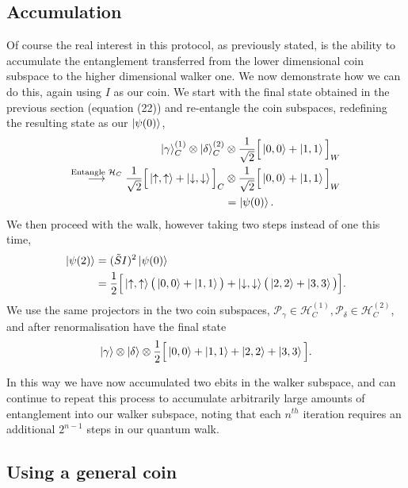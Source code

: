 \subsection{Accumulation}
Of course the real interest in this protocol, as previously stated, is the ability to accumulate the entanglement transferred from the lower dimensional coin subspace to the higher dimensional walker one. We now demonstrate how we can do this, again using $I$ as our coin. We start with the final state obtained in the previous section (equation (22)) and re-entangle the coin subspaces, redefining the resulting state as our $\ket{\psi(0)}$,
\begin{align}
    \ket{\gamma}^{(1)}_C \otimes \ket{\delta}^{(2)}_C &\otimes \frac{1}{\sqrt{2}}\Big [\ket{0, 0} + \ket{1, 1}\Big ]_W\\
    \overset{\text{Entangle }\mathcal{H}_C}{\longrightarrow} \frac{1}{\sqrt{2}} \Big [\ket{\uparrow, \uparrow} + \ket{\downarrow, \downarrow}\Big ]_C &\otimes \frac{1}{\sqrt{2}}\Big [\ket{0, 0} + \ket{1, 1}\Big ]_W\\
    &=\ket{\psi(0)}.
\end{align}
We then proceed with the walk, however taking two steps instead of one this time,
\begin{align}
    \ket{\psi(2)} &= (\tilde{S}I)^2\ket{\psi(0)}\\
    &= \frac{1}{2}\Big[\ket{\uparrow,\uparrow}\big (\ket{0,0}+\ket{1,1}\big ) + \ket{\downarrow,\downarrow}\big (\ket{2,2} + \ket{3,3}\big )\Big ].
\end{align}
We use the same projectors in the two coin subspaces, $\mathcal{P}_\gamma \in \mathcal{H}^{(1)}_C,  \mathcal{P}_\delta \in \mathcal{H}^{(2)}_C$, and after renormalisation have the final state
\begin{equation}
    \ket{\gamma}\otimes\ket{\delta}\otimes\frac{1}{2}\Big[\ket{0,0} + \ket{1,1} + \ket{2,2} + \ket{3,3}\Big ].
\end{equation}

In this way we have now accumulated two ebits in the walker subspace, and can continue to repeat this process to accumulate arbitrarily large amounts of entanglement into our walker subspace, noting that each $n^{th}$ iteration requires an additional $2^{n-1}$ steps in our quantum walk.

\subsection{Using a general coin}
